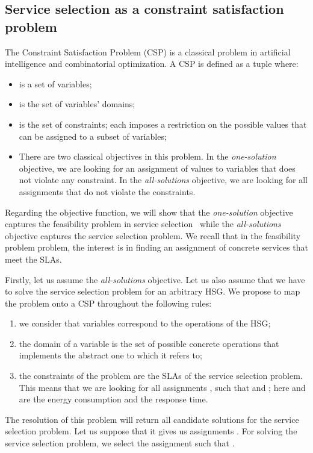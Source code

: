 \documentclass[a4paper]{article}
\begin{document}
\subsection{Service selection as a constraint satisfaction problem} \label{Decomposition}
The Constraint Satisfaction Problem (CSP) is a classical problem in artificial intelligence and combinatorial optimization. 
A CSP is defined as a tuple 
where:
\begin{itemize}
\item  is a set of variables;
\item  is the set of variables' domains;
\item  is the set of constraints; each  imposes a restriction on the possible 
values that can be assigned to a subset of variables; 
\item There are two classical objectives in this problem. In the {\it one-solution} objective, we are 
looking for an assignment of values to variables that does not violate any constraint. In the {\it all-solutions}  
objective, we are looking for all assignments that do not violate the constraints. 
\end{itemize}

Regarding the objective function, we will show that the  {\it one-solution} objective captures the 
feasibility problem in service selection~\cite{Ardagna,JISA} while the {\it all-solutions} objective captures the 
service selection problem. We recall that in the feasibility problem problem, the interest is in 
finding an assignment of concrete services that meet the SLAs.  

Firstly, let us assume the {\it all-solutions} objective. 
Let us also assume that we have to solve the service selection problem for an arbitrary HSG. We propose to map 
the problem onto a  CSP throughout the following rules:
\begin{enumerate}
\item we consider that variables correspond to the operations of the HSG;
\item the domain of a variable is the set of possible concrete operations that 
implements the abstract one to which it refers to;
\item the constraints of the problem are the SLAs of the service selection problem. This means that 
we are looking for all assignments , such 
that  and ; here  and  are the 
energy consumption and the response time.
\end{enumerate}

The resolution of this problem will return all candidate solutions for the service selection problem. 
Let us suppose that it gives us  assignments . For solving the service 
selection problem, we select the assignment  such that 
. 
\end{document}
